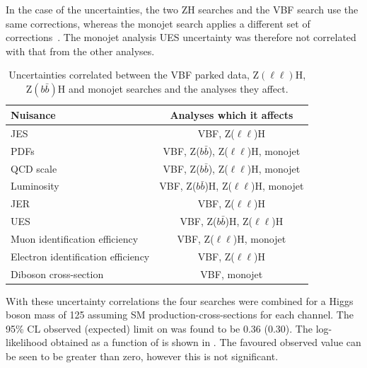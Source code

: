 In the case of the \MET uncertainties, the two ZH searches and the \ac{VBF} search use the same \MET corrections, whereas the monojet search applies a different set of corrections~\cite{CMS-PAS-EXO-12-055}. The monojet analysis \ac{UES} uncertainty was therefore not correlated with that from the other analyses.

\begin{table}
  \caption{Uncertainties correlated between the \ac{VBF} parked data, Z$(\ell\ell)$H, Z$(b\bar{b})$H and monojet searches and the analyses they affect.}
  \label{tab:parkedcorrs}
  \begin{tabular}{|l|c|}
      \hline
      Nuisance & Analyses which it affects \\
      \hline
      \ac{JES} & VBF, Z($\ell\ell$)H \\
      PDFs & VBF, Z($b\bar{b}$), Z($\ell\ell$)H, monojet \\
      QCD scale & VBF, Z($b\bar{b}$), Z($\ell\ell$)H, monojet \\
      Luminosity & VBF, Z($b\bar{b}$)H, Z($\ell\ell$)H, monojet \\
      \ac{JER} & VBF, Z($\ell\ell$)H \\
      \ac{UES} & VBF, Z($b\bar{b}$)H, Z($\ell\ell$)H \\
      Muon identification efficiency & VBF, Z($\ell\ell$)H, monojet \\
      Electron identification efficiency & VBF, Z($\ell\ell$)H \\
      Diboson cross-section & VBF, monojet \\
      \hline
    \end{tabular}
\end{table}

With these uncertainty correlations the four searches were combined for a Higgs boson mass of 125 \GeV assuming \ac{SM} production-cross-sections for each channel. The 95\% \ac{CL} observed (expected) limit on \BRinv was found to be 0.36 (0.30). The log-likelihood obtained as a function of \BRinv is shown in . The favoured observed value can be seen to be greater than zero, however this is not significant.

